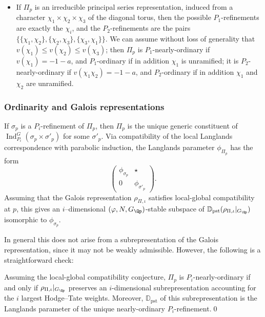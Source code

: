 \documentclass[10pt,reqno,a4paper]{amsart}
\begin{document}
\begin{example}
\begin{itemize}
  	\item If $\Pi_p$ is an irreducible principal series representation, induced from a character $\chi_1 \times \chi_2 \times \chi_3$ of the diagonal torus, then the possible $P_1$-refinements are exactly the $\chi_i$, and the $P_2$-refinements are the pairs $\{ \{\chi_1, \chi_2\}, \{\chi_2, \chi_3\}, \{\chi_3, \chi_1\}\}$. We can assume without loss of generality that $v(\chi_1) \le v(\chi_2) \le v(\chi_3)$; then $\Pi_p$ is $P_1$-nearly-ordinary if $v(\chi_1) = -1-a$, and $P_1$-ordinary if in addition $\chi_1$ is unramified; it is $P_2$-nearly-ordinary if $v(\chi_1\chi_2) = -1-a$, and $P_2$-ordinary if in addition $\chi_1$ and $\chi_2$ are unramified.
  \end{itemize}
 \end{example}

 \subsubsection*{Ordinarity and Galois representations}


  If $\sigma_p$ is a $P_i$-refinement of $\Pi_p$, then $\Pi_p$ is the unique generic constituent of $\operatorname{Ind}_{P_i}^G( \sigma_p \times \sigma'_p)$ for some $\sigma'_p$. Via compatibility of the local Langlands correspondence with parabolic induction, the Langlands parameter $\phi_{\Pi_p}$ has the form
  \[ \begin{pmatrix}\phi_{\sigma_p} & {\star}\\ 0 & \phi_{\sigma'_p} \end{pmatrix}. \]
  Assuming that the Galois representation $\rho_{\Pi, \iota}$ satisfies local-global compatibility at $p$, this gives an $i$--dimensional $(\varphi, N, G_{\Qp})$-stable subspace of $\mathbb{D}_{\mathrm{pst}}(\rho_{\Pi, \iota}|_{G_{\Qp}})$ isomorphic to $\phi_{\sigma_p}$.

  In general this does not arise from a subrepresentation of the Galois representation, since it may not be weakly admissible. However, the following is a straightforward check:

  \begin{proposition}
   Assuming the local-global compatibility conjecture, $\Pi_p$ is $P_i$-nearly-ordinary if and only if $\rho_{\Pi, \iota}|_{G_{\Qp}}$ preserves an $i$-dimensional subrepresentation accounting for the $i$ largest Hodge--Tate weights. Moreover, $\mathbb{D}_{\mathrm{pst}}$ of this subrepresentation is the Langlands parameter of the unique nearly-ordinary $P_i$-refinement.\qed
  \end{proposition}
\end{document}
